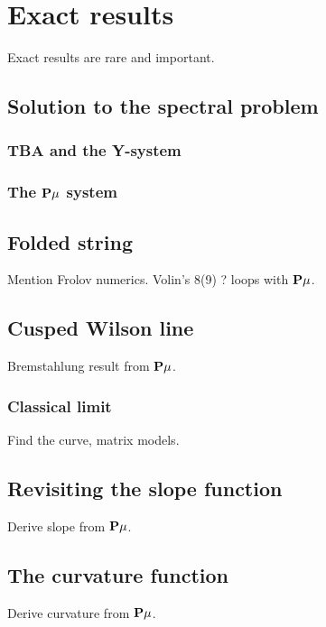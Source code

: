 
\section{Exact results}

Exact results are rare and important.

\subsection{Solution to the spectral problem}

\subsubsection{TBA and the Y-system}

\subsubsection{The ${\bf P}\mu$ system}

\subsection{Folded string}

Mention Frolov numerics. Volin's 8(9) ? loops with ${\bf P}\mu$.

\subsection{Cusped Wilson line}

Bremstahlung result from ${\bf P}\mu$.

\subsubsection{Classical limit}

Find the curve, matrix models.

\subsection{Revisiting the slope function}

Derive slope from ${\bf P}\mu$.

\subsection{The curvature function}

Derive curvature from ${\bf P}\mu$.

